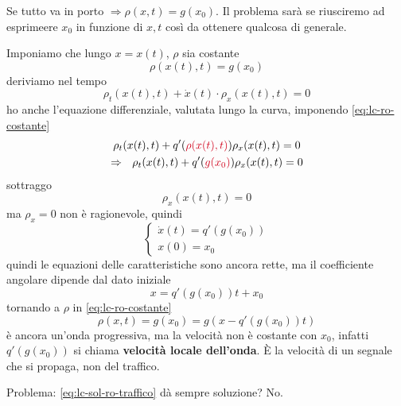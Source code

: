\documentclass[10pt,a4paper,twoside,openright]{book}
\begin{document}

Se tutto va in porto $\Rightarrow \rho ( x,t) =g( x_{0})$. Il problema sarà se riusciremo ad esprimeere $x_{0}$ in funzione di $x,t$ così da ottenere qualcosa di generale.

Imponiamo che lungo $x=x( t)$, $\rho $ sia costante
\begin{equation}
	\rho ( x( t) ,t) =g( x_{0})
	\label{eq:lc-ro-costante}
\end{equation}
deriviamo nel tempo
\begin{equation*}
	\rho _{t}( x( t) ,t) +\dot{x}( t) \cdotp \rho _{x}( x( t) ,t) =0
\end{equation*}
ho anche l'equazione differenziale, valutata lungo la curva, imponendo \eqref{eq:lc-ro-costante}
\begin{gather*}
	\rho _{t}( x( t) ,t) +q'(\textcolor[rgb]{0.82,0.01,0.11}{\rho ( x( t) ,t)}) \rho _{x}( x( t) ,t) =0\\
	\Rightarrow \ \ \rho _{t}( x( t) ,t) +q'(\textcolor[rgb]{0.82,0.01,0.11}{g( x_{0})}) \rho _{x}( x( t) ,t) =0
\end{gather*}
sottraggo
\begin{equation*}
	[\dot{x}( t) -q'( g( x_{0}))] \rho _{x}( x( t) ,t) =0
\end{equation*}
ma $\rho _{x} =0$ non è ragionevole, quindi
\begin{equation*}
	\begin{cases}
		\dot{x}( t) =q'( g( x_{0})) \\
		x( 0) =x_{0}                
	\end{cases}
\end{equation*}
quindi le equazioni delle caratteristiche sono ancora rette, ma il coefficiente angolare dipende dal dato iniziale
\begin{equation}
	x=q'( g( x_{0})) t+x_{0}
\end{equation}
tornando a $\rho $ in \eqref{eq:lc-ro-costante}
\begin{equation}
	\rho ( x,t) =g( x_{0}) =g( x-q'( g( x_{0})) t)
	\label{eq:lc-sol-ro-traffico}
\end{equation}
è ancora un'onda progressiva, ma la velocità non è costante con $x_{0}$, infatti $q'( g( x_{0}))$ si chiama \textbf{velocità locale dell'onda}. È la velocità di un segnale che si propaga, non del traffico.

Problema: \eqref{eq:lc-sol-ro-traffico} dà sempre soluzione? No.

\end{document}
